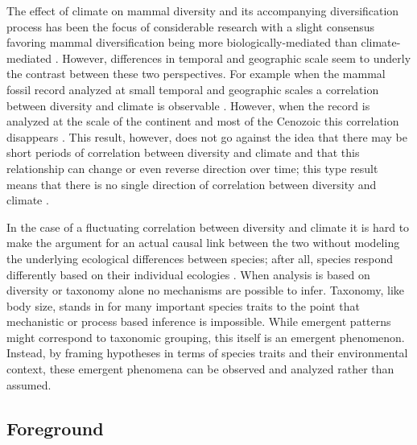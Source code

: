 \documentclass[12pt,letterpaper]{article}
\begin{document}
The effect of climate on mammal diversity and its accompanying diversification process has been the focus of considerable research with a slight consensus favoring mammal diversification being more biologically-mediated than climate-mediated \citep{Alroy1996a,Alroy2000g,Figueirido2012,Clyde1998a}. However, differences in temporal and geographic scale seem to underly the contrast between these two perspectives. For example when the mammal fossil record analyzed at small temporal and geographic scales a correlation between diversity and climate is observable \citep{Clyde1998a}. However, when the record is analyzed at the scale of the continent and most of the Cenozoic this correlation disappears \citep{Alroy2000g}. This result, however, does not go against the idea that there may be short periods of correlation between diversity and climate and that this relationship can change or even reverse direction over time; this type result means that there is no single direction of correlation between diversity and climate \citep{Figueirido2012}. 

In the case of a fluctuating correlation between diversity and climate it is hard to make the argument for an actual causal link between the two without modeling the underlying ecological differences between species; after all, species respond differently based on their individual ecologies \citep{Blois2009}. When analysis is based on diversity or taxonomy alone no mechanisms are possible to infer. Taxonomy, like body size, stands in for many important species traits to the point that mechanistic or process based inference is impossible. While emergent patterns might correspond to taxonomic grouping, this itself is an emergent phenomenon. Instead, by framing hypotheses in terms of species traits and their environmental context, these emergent phenomena can be observed and analyzed rather than assumed.



\subsection*{Foreground}
\end{document}
